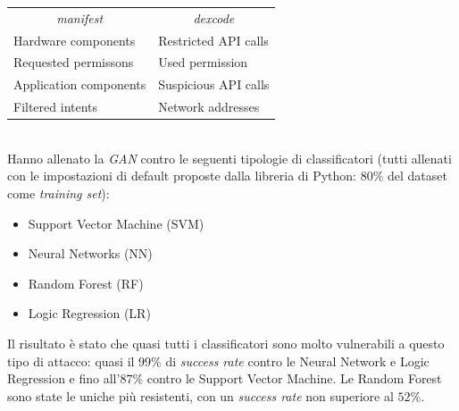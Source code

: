 \begin{center}
    \begin{tabular}{ll}
    \cline{1-2}
    \multicolumn{1}{c}{\textit{manifest}} & \multicolumn{1}{c}{\textit{dexcode}} \\
    \cline{1-2} 
        Hardware components & Restricted API calls\\ [0.5ex]
        Requested permissons & Used permission  \\ [0.5ex]
        Application components & Suspicious API calls \\ [0.5ex]
        Filtered intents & Network addresses \\ [0.5ex]
    \cline{1-2}
    \end{tabular}
\end{center}
\ \\
Hanno allenato la \textit{GAN} contro le seguenti tipologie di classificatori (tutti allenati con le impostazioni di default proposte dalla libreria  di Python: \(80\%\) del dataset come \textit{training set}):

\begin{itemize}
    \item Support Vector Machine (SVM)
    \item Neural Networks (NN)
    \item Random Forest (RF)
    \item Logic Regression (LR)
\end{itemize}

Il risultato è stato che quasi tutti i classificatori sono molto vulnerabili a questo tipo di attacco: quasi il \(99 \%\) di \textit{success rate} contro le Neural Network e Logic Regression e fino all'\(87 \%\) contro le Support Vector Machine. Le Random Forest sono state le uniche più resistenti, con un \textit{success rate} non superiore al \(52 \%\).

